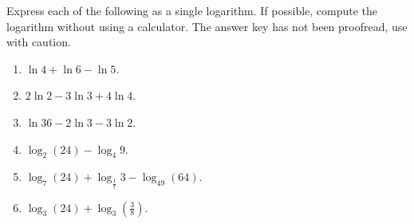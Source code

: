 Express each of the following as a single logarithm. If possible, compute the logarithm without using a calculator. The answer key has not been proofread, use with caution.

\begin{enumerate}[ref={\fcProblemRef}]
\item   $\ln 4 + \ln 6 - \ln 5$.

\item \label{problem2ln(2)-3ln(3)+4ln(4)} $2\ln 2 - 3\ln 3 + 4\ln 4$.

\item   $\ln 36 - 2\ln 3 - 3\ln 2$.


\item $\log_2(24)-\log_{4}9$.


\item \label{problemlog_7(24)+log_(1/7)3-log_(49)64} $\log_7(24)+\log_{\frac{1}{7}}3-\log_{49} (64)$.

\item $\log_3(24)+\log_{3}\left(\frac{3}{8}\right)$.


\end{enumerate}
